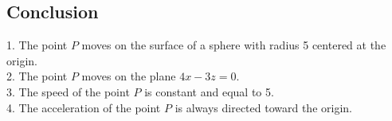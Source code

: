 \documentclass[11pt]{article}
\begin{document}
\newpage

\subsection{Conclusion}

1. The point \( P \) moves on the surface of a sphere with radius 5 centered at the origin. \\
2. The point \( P \) moves on the plane \( 4x - 3z = 0 \). \\
3. The speed of the point \( P \) is constant and equal to 5. \\
4. The acceleration of the point \( P \) is always directed toward the origin.
\end{document}

